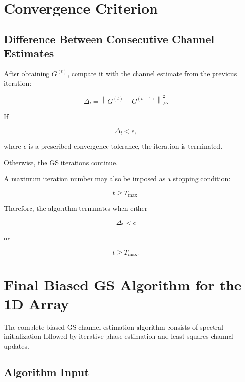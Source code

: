\documentclass[12pt,a4paper]{article}
\begin{document}
\section{Convergence Criterion}

\subsection{Difference Between Consecutive Channel Estimates}

After obtaining $G^{(t)}$, compare it with the channel estimate from the previous iteration:

\begin{equation}
\boxed{
\Delta_t
=
\left\|
G^{(t)}
-
G^{(t-1)}
\right\|_F^2
}.
\tag{341}
\end{equation}

If

\begin{equation}
\boxed{
\Delta_t<\epsilon
},
\tag{342}
\end{equation}

where $\epsilon$ is a prescribed convergence tolerance, the iteration is terminated.

Otherwise, the GS iterations continue.

A maximum iteration number may also be imposed as a stopping condition:

\begin{equation}
\boxed{
t\geq T_{\max}
}.
\tag{343}
\end{equation}

Therefore, the algorithm terminates when either

\begin{equation}
\Delta_t<\epsilon
\tag{344}
\end{equation}

or

\begin{equation}
t\geq T_{\max}.
\tag{345}
\end{equation}

\section{Final Biased GS Algorithm for the 1D Array}

The complete biased GS channel-estimation algorithm consists of spectral initialization followed by iterative phase estimation and least-squares channel updates.

\subsection{Algorithm Input}
\end{document}
